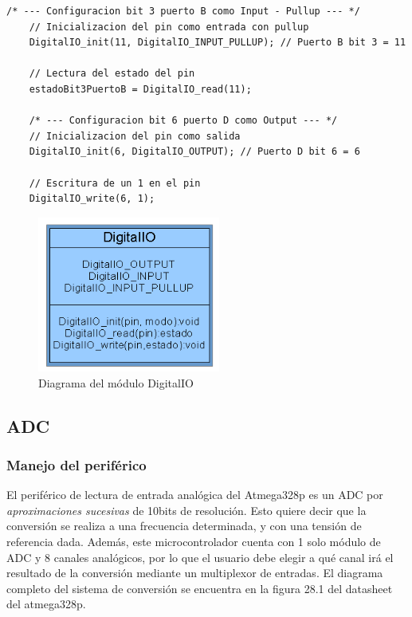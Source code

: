 \begin{lstlisting}[style=CStyle]
	/* --- Configuracion bit 3 puerto B como Input - Pullup --- */
	// Inicializacion del pin como entrada con pullup
	DigitalIO_init(11, DigitalIO_INPUT_PULLUP); // Puerto B bit 3 = 11
	
	// Lectura del estado del pin
	estadoBit3PuertoB = DigitalIO_read(11);
	
	/* --- Configuracion bit 6 puerto D como Output --- */
	// Inicializacion del pin como salida
	DigitalIO_init(6, DigitalIO_OUTPUT); // Puerto D bit 6 = 6
	
	// Escritura de un 1 en el pin
	DigitalIO_write(6, 1);
\end{lstlisting}

\begin{figure}[!ht]
	\centering
	\includegraphics[width=6cm,scale=1]{resources/3_1-moduloDigitalIO.png}
	\caption{Diagrama del módulo DigitalIO}
	\label{fig:\thefigure}
\end{figure}


\subsection{ADC}

\subsubsection{Manejo del periférico}
El periférico de lectura de entrada analógica del Atmega328p es un ADC por \textit{aproximaciones sucesivas} de 10bits de resolución. Esto quiere decir que la conversión se realiza a una frecuencia determinada, y con una tensión de referencia dada. Además, este microcontrolador cuenta con 1 solo módulo de ADC y 8 canales analógicos, por lo que el usuario debe elegir a qué canal irá el resultado de la conversión mediante un multiplexor de entradas. El diagrama completo del sistema de conversión se encuentra en la figura 28.1 del datasheet del atmega328p.

